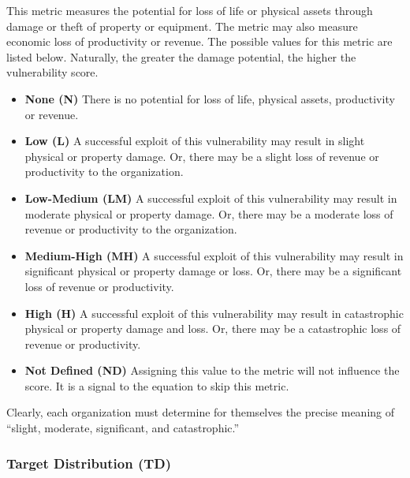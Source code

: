         This metric measures the potential for loss of life or physical assets
        through damage or theft of property or equipment. The metric may also
        measure economic loss of productivity or revenue. The possible values
        for this metric are listed below. Naturally, the greater the
        damage potential, the higher the vulnerability score.

        \begin{itemize}
          \item
            \textbf{None (N)} There is no potential for loss of life, physical
            assets, productivity or revenue.
          \item
            \textbf{Low (L)} A successful exploit of this vulnerability may result
            in slight physical or property damage. Or, there may be a slight loss
            of revenue or productivity to the organization.
          \item
            \textbf{Low-Medium (LM)} A successful exploit of this vulnerability
            may result in moderate physical or property damage. Or, there may be a
            moderate loss of revenue or productivity to the organization.
          \item
            \textbf{Medium-High (MH)} A successful exploit of this vulnerability
            may result in significant physical or property damage or loss. Or,
            there may be a significant loss of revenue or productivity.
          \item
            \textbf{High (H)} A successful exploit of this vulnerability may
            result in catastrophic physical or property damage and loss. Or, there
            may be a catastrophic loss of revenue or productivity.
          \item
            \textbf{Not Defined (ND)} Assigning this value to the metric will not
            influence the score. It is a signal to the equation to skip this
            metric.
        \end{itemize}

        Clearly, each organization must determine for themselves the precise
        meaning of ``slight, moderate, significant, and catastrophic.''

      \subsubsection{Target Distribution (TD)}\label{subsubsec:target-distribution-td}

